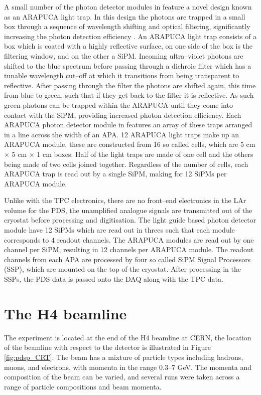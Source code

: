 A small number of the photon detector modules in \protodune{} feature a novel 
design known as an ARAPUCA light trap. In this design the photons are trapped 
in a small box through a sequence of wavelength shifting and optical 
filtering, significantly increasing the photon detection efficiency 
\cite{Segreto:2018jdx}. An ARAPUCA light trap consists of a box which is 
coated with a highly reflective surface, on one side of the box is the 
filtering window, and on the other a SiPM. Incoming ultra--violet photons are 
shifted to the blue spectrum before passing through a dichroic filter which 
has a tunable wavelength cut--off at which it transitions from being 
transparent to reflective. After passing through the filter the photons are 
shifted again, this time from blue to green, such that if they get back to the 
filter it is reflective. As such green photons can be trapped within the 
ARAPUCA until they come into contact with the SiPM, providing increased photon 
detection efficiency. Each ARAPUCA photon detector module in \protodune{} 
features an array of these traps arranged in a line across the width of an 
APA. 12 ARAPUCA light traps make up an ARAPUCA module, these are constructed 
from 16 so called cells, which are 5 cm $\times$ 5 cm $\times$ 1 cm boxes. 
Half of the light traps are made of one cell and the others being made of two 
cells joined together. Regardless of the number of cells, each ARAPUCA trap is 
read out by a single SiPM, making for 12 SiPMs per ARAPUCA module.

Unlike with the TPC electronics, there are no front--end electronics in the LAr
volume for the PDS, the unamplified analogue signals are transmitted out of the
cryostat before processing and digitisation. The light guide based photon 
detector module have 12 SiPMs which are read out in threes such that each 
module corresponds to 4 readout channels. The ARAPUCA modules are read out by
one channel per SiPM, resulting in 12 channels per ARAPUCA module. The readout 
channels from each APA are processed by four so called SiPM Signal Processors 
(SSP), which are mounted on the top of the cryostat. After processing in the 
SSPs, the PDS data is passed onto the DAQ along with the TPC data.

\section{The H4 beamline} \label{sec:h4}

The \protodune{} experiment is located at the end of the H4 beamline at CERN,
the location of the beamline with respect to the detector is illustrated in
Figure \ref{fig:pdsp_CRT}. The beam has a mixture of particle types including
hadrons, muons, and electrons, with momenta in the range 0.3--7 GeV. The momenta
and composition of the beam can be varied, and several runs were taken across a
range of particle compositions and beam momenta.

